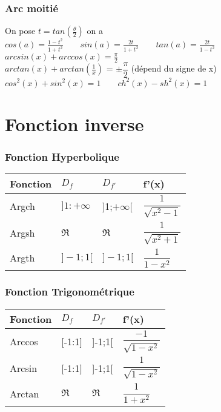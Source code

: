\documentclass[9pt]{article}
\begin{document}
\begin{multicols*}{2}
\section{Arc moitié}
On pose $t=tan(\frac{\theta}{2})$ on a\\
$cos(a) = \frac{1-t^2}{1+t^2} \qquad sin(a) = \frac{2t}{1+t^2} \qquad tan(a) = \frac{2t}{1-t^2}$\\
$arcsin(x) + arccos(x) = \frac{\pi}{2}$\\
$arctan(x) + arctan(\frac{1}{x})$ = $\pm\dfrac{\pi}{2}$ (dépend du signe de x)\\
$cos^2(x)+sin^2(x) = 1 \qquad ch^2(x) - sh^2(x) = 1$
\part*{Fonction inverse}
\section{Fonction Hyperbolique}
\begin{center}
  \begin{tabular}{|l|l|l|l|} \hline
    Fonction & $D_f$ & $D_{f'}$ & f'(x) \\ \hline
    Argch & $]1:+\infty$ & ]1;$+\infty$[ & $\dfrac{1}{\sqrt{x^2-1}}$ \\   \hline
    Argsh & $\Re$ & $\Re$ & $\dfrac{1}{\sqrt{x^2+1}}$ \\  \hline
    Argth & $]-1;1[$ & $]-1;1[$ & $\dfrac{1}{1-x^2}$ \\  \hline
  \end{tabular}
\end{center}
\section{Fonction Trigonométrique}
\begin{center}
\begin{tabular}{|l|l|l|l|}
\hline
Fonction & $D_f$ & $D_{f'}$ & f'(x) \\ \hline
Arccos & [-1:1] & ]-1;1[ & $\dfrac{-1}{\sqrt{1-x^2}}$ \\  \hline
Arcsin & [-1:1] & ]-1;1[ & $\dfrac{1}{\sqrt{1-x^2}}$ \\ \hline
Arctan & $\Re$ & $\Re$ & $\dfrac{1}{1+x^2}$ \\ \hline
\end{tabular}
\end{center}


\end{multicols*}
\end{document}
